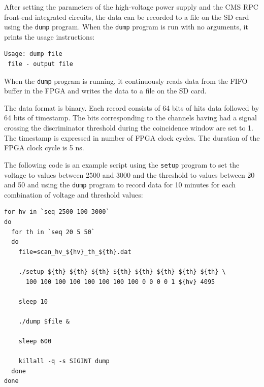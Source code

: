 \documentclass[12pt, a4paper]{article}
\begin{document}
After setting the parameters of the high-voltage power supply and the CMS RPC front-end integrated circuits, the data can be recorded to a file on the SD card using the \texttt{dump} program. When the \texttt{dump} program is run with no arguments, it prints the usage instructions:
\vspace{-1ex}
\begin{verbatim}
Usage: dump file
 file - output file
\end{verbatim}

When the \texttt{dump} program is running, it continuously reads data from the FIFO buffer in the FPGA and writes the data to a file on the SD card.

The data format is binary. Each record consists of 64 bits of hits data followed by 64 bits of timestamp. The bits corresponding to the channels having had a signal crossing the discriminator threshold during the coincidence window are set to 1. The timestamp is expressed in number of FPGA clock cycles. The duration of the FPGA clock cycle is 5 ns.

The following code is an example script using the \texttt{setup} program to set the voltage to values between 2500 and 3000 and the threshold to values between 20 and 50 and using the \texttt{dump} program to record data for 10 minutes for each combination of voltage and threshold values:
\vspace{-1ex}
\begin{verbatim}
for hv in `seq 2500 100 3000`
do
  for th in `seq 20 5 50`
  do
    file=scan_hv_${hv}_th_${th}.dat

    ./setup ${th} ${th} ${th} ${th} ${th} ${th} ${th} ${th} \
      100 100 100 100 100 100 100 100 0 0 0 0 1 ${hv} 4095

    sleep 10

    ./dump $file &

    sleep 600

    killall -q -s SIGINT dump
  done
done
\end{verbatim}

\newpage

\printbibliography
\end{document}
